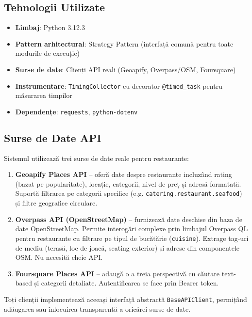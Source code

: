\documentclass[12pt,a4paper]{article}
\begin{document}
\subsection{Tehnologii Utilizate}

\begin{itemize}
    \item \textbf{Limbaj}: Python 3.12.3
    \item \textbf{Pattern arhitectural}: Strategy Pattern (interfață comună pentru toate modurile de execuție)
    \item \textbf{Surse de date}: Clienți API reali (Geoapify, Overpass/OSM, Foursquare)
    \item \textbf{Instrumentare}: \texttt{TimingCollector} cu decorator \texttt{@timed\_task} pentru măsurarea timpilor
    \item \textbf{Dependențe}: \texttt{requests}, \texttt{python-dotenv}
\end{itemize}

\subsection{Surse de Date API}
\label{sec:api}

Sistemul utilizează trei surse de date reale pentru restaurante:

\begin{enumerate}
    \item \textbf{Geoapify Places API} -- oferă date despre restaurante incluzând rating (bazat pe popularitate), locație, categorii, nivel de preț și adresă formatată. Suportă filtrarea pe categorii specifice (e.g. \texttt{catering.restaurant.seafood}) și filtre geografice circulare.

    \item \textbf{Overpass API (OpenStreetMap)} -- furnizează date deschise din baza de date OpenStreetMap. Permite interogări complexe prin limbajul Overpass QL pentru restaurante cu filtrare pe tipul de bucătărie (\texttt{cuisine}). Extrage tag-uri de mediu (terasă, loc de joacă, seating exterior) și adrese din componentele OSM. Nu necesită cheie API.

    \item \textbf{Foursquare Places API} -- adaugă o a treia perspectivă cu căutare text-based și categorii detaliate. Autentificarea se face prin Bearer token.
\end{enumerate}

Toți clienții implementează aceeași interfață abstractă \texttt{BaseAPIClient}, permițând adăugarea sau înlocuirea transparentă a oricărei surse de date.
\end{document}
